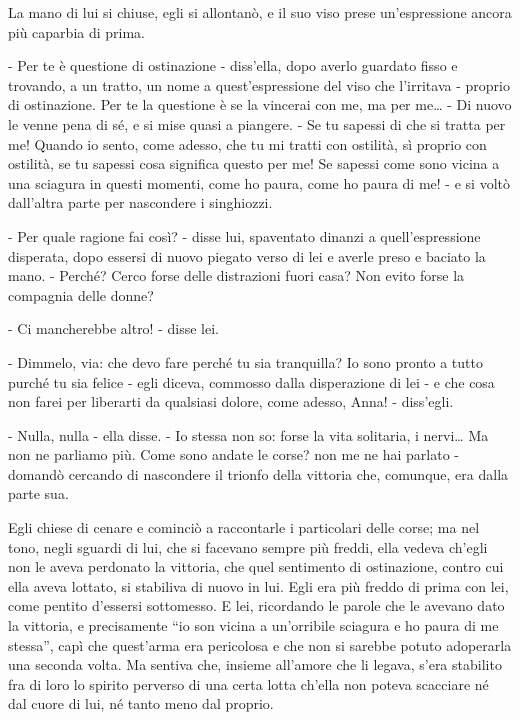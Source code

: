 La mano di lui si chiuse, egli si allontanò, e il suo viso prese un'espressione ancora più caparbia di prima. 

- Per te è questione di ostinazione - diss'ella, dopo averlo guardato fisso e trovando, a un tratto, un nome a quest'espressione del viso che l'irritava - proprio di ostinazione. Per te la questione è se la vincerai con me, ma per me\ldots{} - Di nuovo le venne pena di sé, e si mise quasi a piangere. - Se tu sapessi di che si tratta per me! Quando io sento, come adesso, che tu mi tratti con ostilità, sì proprio con ostilità, se tu sapessi cosa significa questo per me! Se sapessi come sono vicina a una sciagura in questi momenti, come ho paura, come ho paura di me! - e si voltò dall'altra parte per nascondere i singhiozzi. 

- Per quale ragione fai così? - disse lui, spaventato dinanzi a quell'espressione disperata, dopo essersi di nuovo piegato verso di lei e averle preso e baciato la mano. - Perché? Cerco forse delle distrazioni fuori casa? Non evito forse la compagnia delle donne? 

- Ci mancherebbe altro! - disse lei. 

- Dimmelo, via: che devo fare perché tu sia tranquilla? Io sono pronto a tutto purché tu sia felice - egli diceva, commosso dalla disperazione di lei - e che cosa non farei per liberarti da qualsiasi dolore, come adesso, Anna! - diss'egli. 

- Nulla, nulla - ella disse. - Io stessa non so: forse la vita solitaria, i nervi\ldots{} Ma non ne parliamo più. Come sono andate le corse? non me ne hai parlato - domandò cercando di nascondere il trionfo della vittoria che, comunque, era dalla parte sua. 

Egli chiese di cenare e cominciò a raccontarle i particolari delle corse; ma nel tono, negli sguardi di lui, che si facevano sempre più freddi, ella vedeva ch'egli non le aveva perdonato la vittoria, che quel sentimento di ostinazione, contro cui ella aveva lottato, si stabiliva di nuovo in lui. Egli era più freddo di prima con lei, come pentito d'essersi sottomesso. E lei, ricordando le parole che le avevano dato la vittoria, e precisamente ``io son vicina a un'orribile sciagura e ho paura di me stessa'', capì che quest'arma era pericolosa e che non si sarebbe potuto adoperarla una seconda volta. Ma sentiva che, insieme all'amore che li legava, s'era stabilito fra di loro lo spirito perverso di una certa lotta ch'ella non poteva scacciare né dal cuore di lui, né tanto meno dal proprio. 

